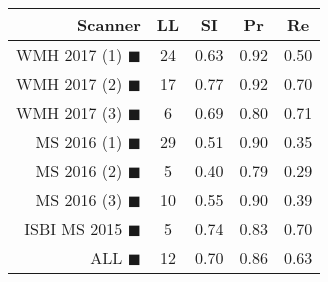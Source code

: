 \begin{tabular}{rcccc}
\toprule
Scanner & LL & SI & Pr & Re \\
\midrule
WMH 2017 (1) {\color[rgb]{ 1.00 0.00 0.00}$\blacksquare$} & 24 & 0.63 & 0.92 & 0.50 \\
WMH 2017 (2) {\color[rgb]{ 1.00 0.50 0.00}$\blacksquare$} & 17 & 0.77 & 0.92 & 0.70 \\
WMH 2017 (3) {\color[rgb]{ 1.00 0.80 0.00}$\blacksquare$} & 6 & 0.69 & 0.80 & 0.71 \\
MS  2016 (1) {\color[rgb]{ 0.20 0.80 0.00}$\blacksquare$} & 29 & 0.51 & 0.90 & 0.35 \\
MS  2016 (2) {\color[rgb]{ 0.00 0.40 1.00}$\blacksquare$} & 5 & 0.40 & 0.79 & 0.29 \\
MS  2016 (3) {\color[rgb]{ 0.60 0.00 1.00}$\blacksquare$} & 10 & 0.55 & 0.90 & 0.39 \\
ISBI MS 2015 {\color[rgb]{ 1.00 0.00 1.00}$\blacksquare$} & 5 & 0.74 & 0.83 & 0.70 \\
\midrule
ALL {\color[rgb]{ 1.00 1.00 1.00}$\blacksquare$} & 12 & 0.70 & 0.86 & 0.63 \\
\bottomrule
\end{tabular}